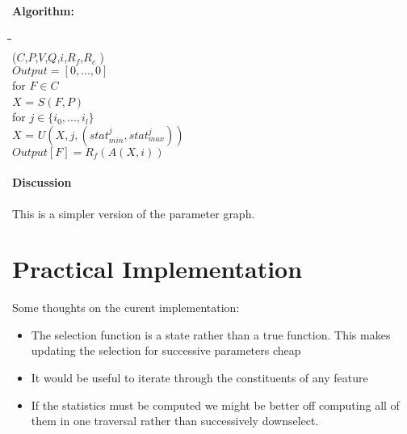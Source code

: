 \documentclass[journal]{vgtc}         %
\begin{document}
\paragraph{Algorithm:}
\begin{tabbing}
\=\hspace{0.2in}\=\hspace{0.2in}\=\hspace{0.2in}\=\hspace{0.2in}\=\\
($C$,$P$,$V$,$Q$,$i$,$R_f$,$R_c$ ) \\
\>\>$Output = [0,...,0]$\\
\>\>for $F \in C$\\
\>\>\>$X$ = $S(F,P)$\\
\>\>\>for $j \in \{i_0,...,i_l\}$\\
\>\>\>\>$X$ = $U(X,j,(stat_{min}^{j},stat_{max}^{j}))$\\
\>\>\>$Output[F] = R_f(A(X,i))$\\
\end{tabbing}

\paragraph{Discussion}

This is a simpler version of the parameter graph. 


\section{Practical Implementation}

Some thoughts on the curent implementation:

\begin{itemize}
\item The selection function is a state rather than a true function. This makes
  updating the selection for successive parameters cheap
\item It would be useful to iterate through the constituents of any feature
\item If the statistics must be computed we might be better off computing all of
  them in one traversal rather than successively downselect.
\end{itemize}
\end{document}
